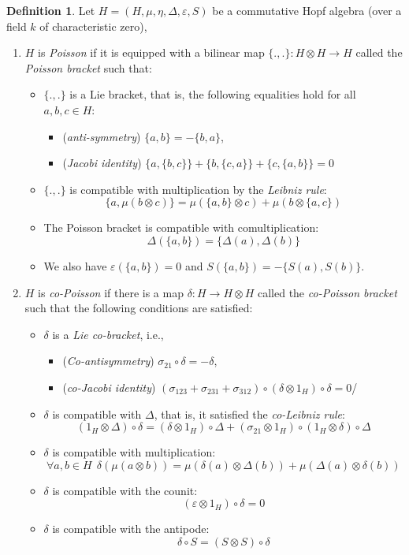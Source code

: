 \documentclass[8pt]{article}
\theoremstyle{definition}
\newtheorem{definition}{Definition}[section]
\theoremstyle{definition}
\theoremstyle{definition}
\theoremstyle{definition}
\theoremstyle{definition}
\theoremstyle{definition}
\theoremstyle{definition}
\theoremstyle{definition}
\theoremstyle{definition}
\theoremstyle{definition}
\theoremstyle{definition}
\theoremstyle{definition}
\theoremstyle{definition}
\theoremstyle{definition}
\theoremstyle{question}
\begin{document}
\begin{definition} Let $H = (H, \mu, \eta, \Delta, \varepsilon, S)$ be a commutative Hopf algebra (over a field $k$ of characteristic zero), 
  \begin{enumerate}
  \item $H$ is \emph{Poisson} if it is equipped with a bilinear map $\{ . , . \} : H \otimes H \to H$
  called the \emph{Poisson bracket} such that:
  \begin{itemize}
    \item $\{ . , . \}$ is a Lie bracket, that is, the following equalities hold for all $a, b, c \in H$:
    \begin{itemize}
      \item (\emph{anti-symmetry}) $\{ a, b\} = - \{ b, a\}$,
      \item (\emph{Jacobi identity}) $\{ a, \{ b, c \}\} + \{ b, \{ c, a \}\} + \{ c, \{a , b \}\} = 0$
    \end{itemize}
    \item $\{ . , . \}$ is compatible with multiplication by the \emph{Leibniz rule}:
    \[
    \{ a, \mu(b \otimes c)\} = \mu(\{ a, b \} \otimes c) + \mu(b \otimes \{ a, c \})
    \]
    \item The Poisson bracket is compatible with comultiplication:
    \[
    \Delta(\{ a, b \}) = \{ \Delta(a), \Delta(b)\}
    \]
    \item We also have $\varepsilon(\{ a, b \}) = 0$ and $S(\{ a, b\}) = - \{ S(a), S(b)\}$.
  \end{itemize}
  \item $H$ is \emph{co-Poisson} if there is a map $\delta : H \to H \otimes H$ called the \emph{co-Poisson bracket} such that
  the following conditions are satisfied:
  \begin{itemize}
    \item $\delta$ is a \emph{Lie co-bracket}, i.e., 
    \begin{itemize}
      \item (\emph{Co-antisymmetry}) $\sigma_{21} \circ \delta = -\delta$,
      \item (\emph{co-Jacobi identity}) $(\sigma_{123} + \sigma_{231} + \sigma_{312}) \circ (\delta \otimes 1_H) \circ \delta = 0$/
    \end{itemize}
    \item $\delta$ is compatible with $\Delta$, that is, it satisfied the \emph{co-Leibniz rule}:
    \[
    (1_H \otimes \Delta) \circ \delta = (\delta \otimes 1_H) \circ \Delta + (\sigma_{21} \otimes 1_H) \circ (1_H \otimes \delta) \circ \Delta
    \]
    \item $\delta$ is compatible with multiplication:
    \[
    \forall a, b \in H \:\: \delta(\mu(a \otimes b)) = \mu(\delta(a) \otimes \Delta(b)) + \mu(\Delta(a) \otimes \delta(b))
    \]
    \item $\delta$ is compatible with the counit:
    \[
    (\varepsilon \otimes 1_H) \circ \delta = 0
    \]
    \item $\delta$ is compatible with the antipode:
    \[
    \delta \circ S = (S \otimes S) \circ \delta
    \]
  \end{itemize}
  \end{enumerate}
\end{definition}
\end{document}

